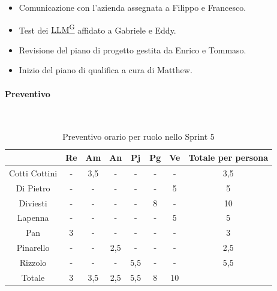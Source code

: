 \documentclass{article}
\begin{document}
\begin{itemize}
\begin{itemize}
                        \item Comunicazione con l'azienda assegnata a Filippo e Francesco.
                        \item Test dei \href{https://code7crusaders.github.io/docs/RTB/documentazione_interna/glossario.html#llm-large-language-model}{LLM\textsuperscript{G}} affidato a Gabriele e Eddy.
                        \item Revisione del piano di progetto gestita da Enrico e Tommaso.
                        \item Inizio del piano di qualifica a cura di Matthew.
                    \end{itemize}
                \end{itemize}

                \paragraph{Preventivo}\mbox{}\\
                \begin{table}[H]
                    \centering
                    \begin{tabular}{|c|c|c|c|c|c|c|c|}
                    \hline
                                  & Re  & Am  & An  & Pj  & Pg  & Ve  & Totale per persona \\ \hline
                    Cotti Cottini & -   & 3,5 & -   & -   & -   & -   & 3,5                \\ \hline
                    Di Pietro     & -   & -   & -   & -   & -   & 5   & 5                  \\ \hline
                    Diviesti      & -   & -   & -   & -   & 8  & -   & 10                 \\ \hline
                    Lapenna       & -   & -   & -   & -   & -   & 5   & 5                  \\ \hline
                    Pan           & 3   & -   & -   & -   & -   & -   & 3                  \\ \hline
                    Pinarello     & -   & -   & 2,5 & -   & -   & -   & 2,5                \\ \hline
                    Rizzolo       & -   & -   & -   & 5,5 & -   & -   & 5,5                \\ \hline
                    Totale        & 3   & 3,5 & 2,5 & 5,5 & 8  & 10  &                    \\ \hline
                    \end{tabular}
                    \caption{Preventivo orario per ruolo nello Sprint 5}
                \end{table}
\end{document}
